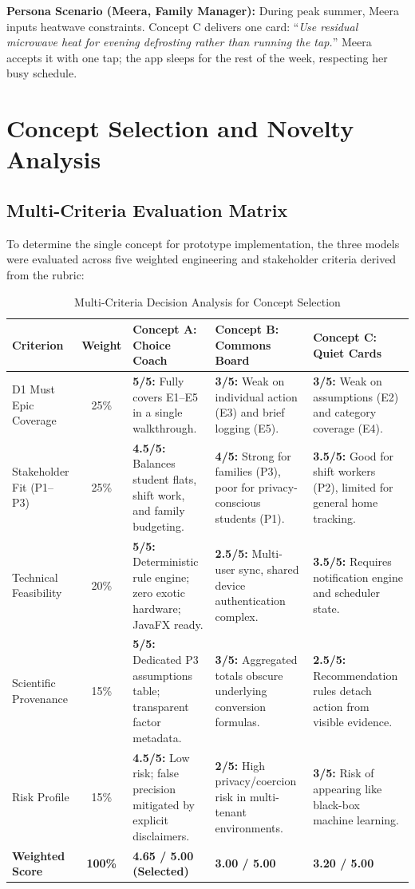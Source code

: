 \documentclass[12pt,a4paper]{article}
\begin{document}
\textbf{Persona Scenario (Meera, Family Manager):} During peak summer, Meera inputs heatwave constraints. Concept C delivers one card: ``\emph{Use residual microwave heat for evening defrosting rather than running the tap.}'' Meera accepts it with one tap; the app sleeps for the rest of the week, respecting her busy schedule.

\section{Concept Selection and Novelty Analysis}

\subsection{Multi-Criteria Evaluation Matrix}
To determine the single concept for prototype implementation, the three models were evaluated across five weighted engineering and stakeholder criteria derived from the rubric:

\begin{table}[ht]
\centering
\small
\caption{Multi-Criteria Decision Analysis for Concept Selection}
\begin{tabularx}{\textwidth}{@{}lcp{4.2cm}p{4.2cm}p{4.2cm}@{}}
\toprule
\textbf{Criterion} & \textbf{Weight} & \textbf{Concept A: Choice Coach} & \textbf{Concept B: Commons Board} & \textbf{Concept C: Quiet Cards}\\
\midrule
D1 Must Epic Coverage & 25\% & \textbf{5/5:} Fully covers E1--E5 in a single walkthrough. & \textbf{3/5:} Weak on individual action (E3) and brief logging (E5). & \textbf{3/5:} Weak on assumptions (E2) and category coverage (E4).\\
Stakeholder Fit (P1--P3) & 25\% & \textbf{4.5/5:} Balances student flats, shift work, and family budgeting. & \textbf{4/5:} Strong for families (P3), poor for privacy-conscious students (P1). & \textbf{3.5/5:} Good for shift workers (P2), limited for general home tracking.\\
Technical Feasibility & 20\% & \textbf{5/5:} Deterministic rule engine; zero exotic hardware; JavaFX ready. & \textbf{2.5/5:} Multi-user sync, shared device authentication complex. & \textbf{3.5/5:} Requires notification engine and scheduler state.\\
Scientific Provenance & 15\% & \textbf{5/5:} Dedicated P3 assumptions table; transparent factor metadata. & \textbf{3/5:} Aggregated totals obscure underlying conversion formulas. & \textbf{2.5/5:} Recommendation rules detach action from visible evidence.\\
Risk Profile & 15\% & \textbf{4.5/5:} Low risk; false precision mitigated by explicit disclaimers. & \textbf{2/5:} High privacy/coercion risk in multi-tenant environments. & \textbf{3/5:} Risk of appearing like black-box machine learning.\\
\midrule
\textbf{Weighted Score} & \textbf{100\%} & \textbf{4.65 / 5.00 (Selected)} & \textbf{3.00 / 5.00} & \textbf{3.20 / 5.00}\\
\bottomrule
\end{tabularx}
\end{table}
\end{document}
